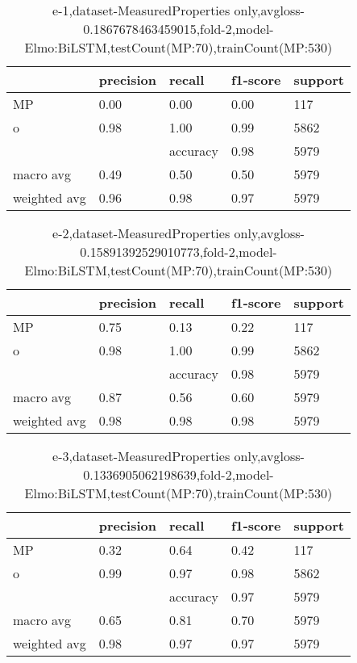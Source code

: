 \begin{table}[!ht] 
\centering
\caption{e-1,dataset-MeasuredProperties only,avgloss-0.1867678463459015,fold-2,model-Elmo:BiLSTM,testCount(MP:70),trainCount(MP:530)}\label{e-1data-mpS.tsv}
\begin{tabularx}{300pt}{|X|X|X|X|X|}
\hline
&precision&recall&f1-score&support\\
\hline
MP&0.00&0.00&0.00&117\\
\hline
o&0.98&1.00&0.99&5862\\
\hline
&&accuracy&0.98&5979\\
\hline
macro avg&0.49&0.50&0.50&5979\\
\hline
weighted avg&0.96&0.98&0.97&5979\\
\hline
\end{tabularx}
\end{table}
\begin{table}[!ht] 
\centering
\caption{e-2,dataset-MeasuredProperties only,avgloss-0.15891392529010773,fold-2,model-Elmo:BiLSTM,testCount(MP:70),trainCount(MP:530)}\label{e-2data-mpS.tsv}
\begin{tabularx}{300pt}{|X|X|X|X|X|}
\hline
&precision&recall&f1-score&support\\
\hline
MP&0.75&0.13&0.22&117\\
\hline
o&0.98&1.00&0.99&5862\\
\hline
&&accuracy&0.98&5979\\
\hline
macro avg&0.87&0.56&0.60&5979\\
\hline
weighted avg&0.98&0.98&0.98&5979\\
\hline
\end{tabularx}
\end{table}
\begin{table}[!ht] 
\centering
\caption{e-3,dataset-MeasuredProperties only,avgloss-0.1336905062198639,fold-2,model-Elmo:BiLSTM,testCount(MP:70),trainCount(MP:530)}\label{e-3data-mpS.tsv}
\begin{tabularx}{300pt}{|X|X|X|X|X|}
\hline
&precision&recall&f1-score&support\\
\hline
MP&0.32&0.64&0.42&117\\
\hline
o&0.99&0.97&0.98&5862\\
\hline
&&accuracy&0.97&5979\\
\hline
macro avg&0.65&0.81&0.70&5979\\
\hline
weighted avg&0.98&0.97&0.97&5979\\
\hline
\end{tabularx}
\end{table}
